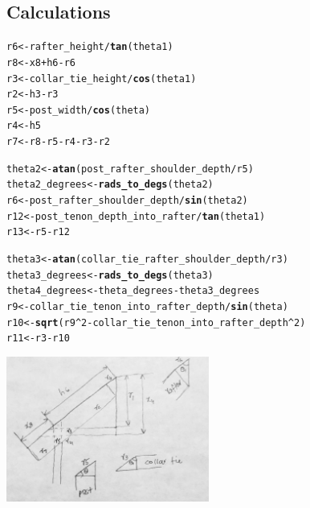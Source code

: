 \documentclass{article}\usepackage[]{graphicx}\usepackage[]{xcolor}
\makeatletter
\newcommand{\hlnum}[1]{\textcolor[rgb]{0.686,0.059,0.569}{#1}}%
\newcommand{\hlopt}[1]{\textcolor[rgb]{0,0,0}{#1}}%
\newcommand{\hlstd}[1]{\textcolor[rgb]{0.345,0.345,0.345}{#1}}%
\newcommand{\hlkwb}[1]{\textcolor[rgb]{0.69,0.353,0.396}{#1}}%
\newcommand{\hlkwd}[1]{\textcolor[rgb]{0.737,0.353,0.396}{\textbf{#1}}}%
\newenvironment{kframe}{%
 \def\at@end@of@kframe{}%
 \ifinner\ifhmode%
  \def\at@end@of@kframe{\end{minipage}}%
  \begin{minipage}{\columnwidth}%
 \fi\fi%
 \def\FrameCommand##1{\hskip\@totalleftmargin \hskip-\fboxsep
 \colorbox{shadecolor}{##1}\hskip-\fboxsep
     \hskip-\linewidth \hskip-\@totalleftmargin \hskip\columnwidth}%
 \MakeFramed {\advance\hsize-\width
   \@totalleftmargin\z@ \linewidth\hsize
   \@setminipage}}%
 {\par\unskip\endMakeFramed%
 \at@end@of@kframe}
\newenvironment{knitrout}{}{} %
\makeatother
\begin{document}
\subsection{Calculations} \label{rafter-lengths-connections-calculations}

\begin{knitrout}
\color{fgcolor}\begin{kframe}
\begin{alltt}
\hlstd{r6} \hlkwb{<-} \hlstd{rafter_height}\hlopt{/}\hlkwd{tan}\hlstd{(theta1)}
\hlstd{r8} \hlkwb{<-} \hlstd{x8} \hlopt{+} \hlstd{h6} \hlopt{-} \hlstd{r6}
\hlstd{r3} \hlkwb{<-} \hlstd{collar_tie_height}\hlopt{/}\hlkwd{cos}\hlstd{(theta1)}
\hlstd{r2} \hlkwb{<-} \hlstd{h3} \hlopt{-} \hlstd{r3}
\hlstd{r5} \hlkwb{<-} \hlstd{post_width}\hlopt{/}\hlkwd{cos}\hlstd{(theta)}
\hlstd{r4} \hlkwb{<-} \hlstd{h5}
\hlstd{r7} \hlkwb{<-} \hlstd{r8} \hlopt{-} \hlstd{r5} \hlopt{-} \hlstd{r4} \hlopt{-} \hlstd{r3} \hlopt{-} \hlstd{r2}

\hlstd{theta2} \hlkwb{<-} \hlkwd{atan}\hlstd{(post_rafter_shoulder_depth}\hlopt{/}\hlstd{r5)}
\hlstd{theta2_degrees} \hlkwb{<-} \hlkwd{rads_to_degs}\hlstd{(theta2)}
\hlstd{r6} \hlkwb{<-} \hlstd{post_rafter_shoulder_depth}\hlopt{/}\hlkwd{sin}\hlstd{(theta2)}
\hlstd{r12} \hlkwb{<-} \hlstd{post_tenon_depth_into_rafter}\hlopt{/}\hlkwd{tan}\hlstd{(theta1)}
\hlstd{r13} \hlkwb{<-} \hlstd{r5} \hlopt{-} \hlstd{r12}

\hlstd{theta3} \hlkwb{<-} \hlkwd{atan}\hlstd{(collar_tie_rafter_shoulder_depth}\hlopt{/}\hlstd{r3)}
\hlstd{theta3_degrees} \hlkwb{<-} \hlkwd{rads_to_degs}\hlstd{(theta3)}
\hlstd{theta4_degrees} \hlkwb{<-} \hlstd{theta_degrees} \hlopt{-} \hlstd{theta3_degrees}
\hlstd{r9} \hlkwb{<-} \hlstd{collar_tie_tenon_into_rafter_depth}\hlopt{/}\hlkwd{sin}\hlstd{(theta)}
\hlstd{r10} \hlkwb{<-} \hlkwd{sqrt}\hlstd{(r9}\hlopt{^}\hlnum{2} \hlopt{-} \hlstd{collar_tie_tenon_into_rafter_depth}\hlopt{^}\hlnum{2}\hlstd{)}
\hlstd{r11} \hlkwb{<-} \hlstd{r3} \hlopt{-} \hlstd{r10}
\end{alltt}
\end{kframe}
\end{knitrout}

\begin{center}
	\includegraphics[width=0.5\textwidth]{images/rafter_length}
\end{center}
\end{document}
